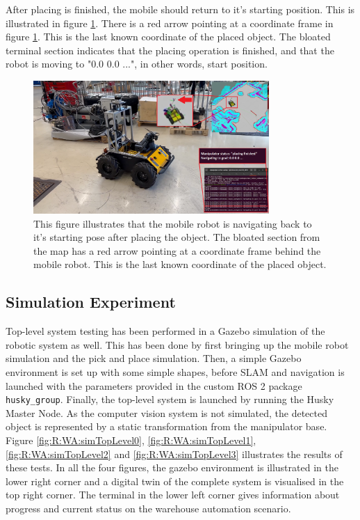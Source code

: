 After placing is finished, the mobile should return to it's starting position. This is illustrated in figure \ref{fig:R:WA:finalExperiment5}. There is a red arrow pointing at a coordinate frame in figure \ref{fig:R:WA:finalExperiment5}. This is the last known coordinate of the placed object. The bloated terminal section indicates that the placing operation is finished, and that the robot is moving to "0.0 0.0 ...", in other words, start position.

\begin{figure}[H]
  \centering
  \includegraphics[width = 0.8\textwidth]{Figures/figHuskyFinalExperiment5.png}
  \caption{This figure illustrates that the mobile robot is navigating back to it's starting pose after placing the object. The bloated section from the map has a red arrow pointing at a coordinate frame behind the mobile robot. This is the last known coordinate of the placed object.}
  \label{fig:R:WA:finalExperiment5}
\end{figure}


\subsection{Simulation Experiment}
Top-level system testing has been performed in a Gazebo simulation of the robotic system as well. This has been done by first bringing up the mobile robot simulation and the pick and place simulation. Then, a simple Gazebo environment is set up with some simple shapes, before SLAM and navigation is launched with the parameters provided in the custom ROS 2 package \lstinline{husky_group}. Finally, the top-level system is launched by running the Husky Master Node. As the computer vision system is not simulated, the detected object is represented by a static transformation from the manipulator base. Figure \ref{fig:R:WA:simTopLevel0}, \ref{fig:R:WA:simTopLevel1}, \ref{fig:R:WA:simTopLevel2} and \ref{fig:R:WA:simTopLevel3} illustrates the results of these tests. In all the four figures, the gazebo environment is illustrated in the lower right corner and a digital twin of the complete system is visualised in the top right corner. The terminal in the lower left corner gives information about progress and current status on the warehouse automation scenario.


